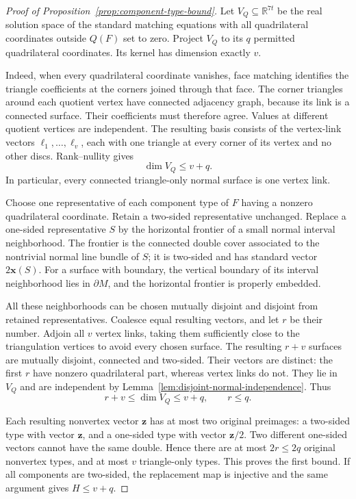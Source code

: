 \begin{proof}[Proof of Proposition~\ref{prop:component-type-bound}]
Let $V_Q\subseteq\mathbb R^{7t}$ be the real solution space of the
standard matching equations with all quadrilateral coordinates outside
$Q(F)$ set to zero. Project $V_Q$ to its $q$ permitted quadrilateral
coordinates. Its kernel has dimension exactly $v$.

Indeed, when every quadrilateral coordinate vanishes, face matching
identifies the triangle coefficients at the corners joined through that
face. The corner triangles around each quotient vertex have connected
adjacency graph, because its link is a connected surface. Their
coefficients must therefore agree. Values at different quotient vertices
are independent. The resulting basis consists of the vertex-link vectors
$\boldsymbol\ell_1,\ldots,\boldsymbol\ell_v$, each with one triangle at
every corner of its vertex and no other discs. Rank--nullity gives
\begin{equation}\label{eq:normal-support-dimension}
                  \dim V_Q\le v+q.
\end{equation}
In particular, every connected triangle-only normal surface is one
vertex link.

Choose one representative of each component type of $F$ having a nonzero
quadrilateral coordinate. Retain a two-sided representative unchanged.
Replace a one-sided representative $S$ by the horizontal frontier of a
small normal interval neighborhood. The frontier is the connected double
cover associated to the nontrivial normal line bundle of $S$; it is
two-sided and has standard vector $2\mathbf x(S)$. For a surface with
boundary, the vertical boundary of its interval neighborhood lies in
$\partial M$, and the horizontal frontier is properly embedded.

All these neighborhoods can be chosen mutually disjoint and disjoint
from retained representatives. Coalesce equal resulting vectors, and let
$r$ be their number. Adjoin all $v$ vertex links, taking them sufficiently
close to the triangulation vertices to avoid every chosen surface. The
resulting $r+v$ surfaces are mutually disjoint, connected and two-sided.
Their vectors are distinct: the first $r$ have nonzero quadrilateral
part, whereas vertex links do not. They lie in $V_Q$ and are independent
by Lemma~\ref{lem:disjoint-normal-independence}. Thus
\[
                r+v\le\dim V_Q\le v+q,
                \qquad r\le q.
\]

Each resulting nonvertex vector $\mathbf z$ has at most two original
preimages: a two-sided type with vector $\mathbf z$, and a one-sided
type with vector $\mathbf z/2$. Two different one-sided vectors cannot
have the same double. Hence there are at most $2r\le2q$ original
nonvertex types, and at most $v$ triangle-only types. This proves the
first bound. If all components are two-sided, the replacement map is
injective and the same argument gives $H\le v+q$.
\end{proof}

